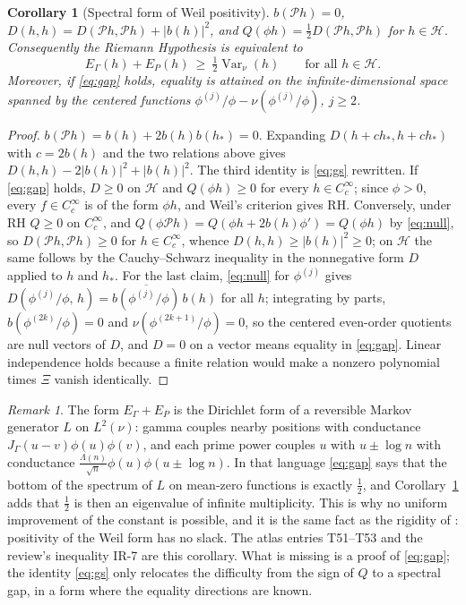 \documentclass[11pt]{article}
\newtheorem{corollary}[proposition]{Corollary}
\theoremstyle{definition}
\theoremstyle{remark}
\newtheorem{remark}[proposition]{Remark}
\begin{document}
\begin{corollary}[Spectral form of Weil positivity]\label{cor:gap}
$b(\mathcal Ph)=0$, $D(h,h)=D(\mathcal Ph,\mathcal Ph)+|b(h)|^2$, and $Q(\phi h)=\tfrac12D(\mathcal Ph,\mathcal Ph)$ for $h\in\mathcal H$. Consequently the Riemann Hypothesis is equivalent to
\begin{equation}\label{eq:gap}
E_\Gamma(h)+E_P(h)\ \ge\ \tfrac12\operatorname{Var}_\nu(h)\qquad\text{for all }h\in\mathcal H .
\end{equation}
Moreover, if \eqref{eq:gap} holds, equality is attained on the infinite-dimensional space spanned by the centered functions $\phi^{(j)}/\phi-\nu(\phi^{(j)}/\phi)$, $j\ge2$.
\end{corollary}

\begin{proof}
$b(\mathcal Ph)=b(h)+2b(h)b(h_*)=0$. Expanding $D(h+ch_*,h+ch_*)$ with $c=2b(h)$ and the two relations above gives $D(h,h)-2|b(h)|^2+|b(h)|^2$. The third identity is \eqref{eq:gs} rewritten. If \eqref{eq:gap} holds, $D\ge0$ on $\mathcal H$ and $Q(\phi h)\ge0$ for every $h\in C_c^\infty$; since $\phi>0$, every $f\in C_c^\infty$ is of the form $\phi h$, and Weil's criterion gives RH. Conversely, under RH $Q\ge0$ on $C_c^\infty$, and $Q(\phi\mathcal Ph)=Q(\phi h+2b(h)\phi')=Q(\phi h)$ by \eqref{eq:null}, so $D(\mathcal Ph,\mathcal Ph)\ge0$ for $h\in C_c^\infty$, whence $D(h,h)\ge|b(h)|^2\ge0$; on $\mathcal H$ the same follows by the Cauchy--Schwarz inequality in the nonnegative form $D$ applied to $h$ and $h_*$. For the last claim, \eqref{eq:null} for $\phi^{(j)}$ gives $D(\phi^{(j)}/\phi,\,h)=\overline{b(\phi^{(j)}/\phi)}\,b(h)$ for all $h$; integrating by parts, $b(\phi^{(2k)}/\phi)=0$ and $\nu(\phi^{(2k+1)}/\phi)=0$, so the centered even-order quotients are null vectors of $D$, and $D=0$ on a vector means equality in \eqref{eq:gap}. Linear independence holds because a finite relation would make a nonzero polynomial times $\Xi$ vanish identically.
\end{proof}

\begin{remark}
The form $E_\Gamma+E_P$ is the Dirichlet form of a reversible Markov generator $L$ on $L^2(\nu)$: gamma couples nearby positions with conductance $J_\Gamma(u-v)\phi(u)\phi(v)$, and each prime power couples $u$ with $u\pm\log n$ with conductance $\frac{\Lambda(n)}{\sqrt n}\phi(u)\phi(u\pm\log n)$. In that language \eqref{eq:gap} says that the bottom of the spectrum of $L$ on mean-zero functions is exactly $\tfrac12$, and Corollary~\ref{cor:gap} adds that $\tfrac12$ is then an eigenvalue of infinite multiplicity. This is why no uniform improvement of the constant is possible, and it is the same fact as the rigidity of \cite[\S2.4]{memo}: positivity of the Weil form has no slack. The atlas entries T51--T53 and the review's inequality IR-7 are this corollary. What is missing is a proof of \eqref{eq:gap}; the identity \eqref{eq:gs} only relocates the difficulty from the sign of $Q$ to a spectral gap, in a form where the equality directions are known.
\end{remark}
\end{document}
